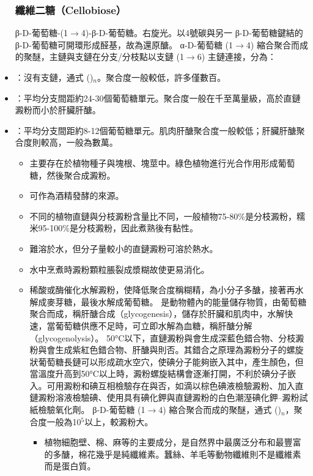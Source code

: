 \documentclass[a4paper,12pt]{report}
\begin{document}
\begin{itemize}
\subsubsection{纖維二糖（Cellobiose）}
β-D-葡萄糖-(1$\to$4)-β-D-葡萄糖。右旋光。以4號碳與另一 β-D-葡萄糖鍵結的β-D-葡萄糖可開環形成醛基，故為還原醣。
α-D-葡萄糖 (1$\to$4) 縮合聚合而成的聚醚，主鏈與支鏈在分支/分枝點以支鏈 (1$\to$6) 主鏈連接，分為：
\bit
\item {}：沒有支鏈，通式 ()$_n$。聚合度一般較低，許多僅數百。
\item {}：平均分支間距約24-30個葡萄糖單元。聚合度一般在千至萬量級，高於直鏈澱粉而小於肝臟肝醣。
\item {}：平均分支間距約8-12個葡萄糖單元。肌肉肝醣聚合度一般較低；肝臟肝醣聚合度則較高，一般為數萬。
\eit
{}
\begin{itemize}
\item 主要存在於植物種子與塊根、塊莖中。綠色植物進行光合作用形成葡萄糖，然後聚合成澱粉。
\item 可作為酒精發酵的來源。
\item 不同的植物直鏈與分枝澱粉含量比不同，一般植物75-80\%是分枝澱粉，糯米95-100\%是分枝澱粉，因此煮熟後有黏性。
\item 難溶於水，但分子量較小的直鏈澱粉可溶於熱水。
\item 水中烹煮時澱粉顆粒脹裂成漿糊故使更易消化。
\item 稀酸或酶催化水解澱粉，使降低聚合度稱糊精，為小分子多醣，接著再水解成麥芽糖，最後水解成葡萄糖。
\eit
{}
是動物體內的能量儲存物質，由葡萄糖聚合而成，稱肝醣合成（glycogenesis），儲存於肝臟和肌肉中，水解快速，當葡萄糖供應不足時，可立即水解為血糖，稱肝醣分解（glycogenolysis）。
50°C以下，直鏈澱粉與會生成深藍色錯合物、分枝澱粉與會生成紫紅色錯合物、肝醣與則否。其錯合之原理為澱粉分子的螺旋狀葡萄糖長鏈可以形成疏水空穴，使碘分子能夠嵌入其中，產生顏色，但當溫度升高到50°C以上時，澱粉螺旋結構會逐漸打開，不利於碘分子嵌入。可用澱粉和碘互相檢驗存在與否，如滴以棕色碘液檢驗澱粉、加入直鏈澱粉溶液檢驗碘、使用具有碘化鉀與直鏈澱粉的白色潮溼碘化鉀–澱粉試紙檢驗氧化劑。
β-D-葡萄糖 (1$\to$4) 縮合聚合而成的聚醚，通式 ()$_n$，聚合度一般為10$^5$以上，較澱粉大。
\begin{itemize}
\item 植物細胞壁、棉、麻等的主要成分，是自然界中最廣泛分布和最豐富的多醣，棉花幾乎是純纖維素。蠶絲、羊毛等動物纖維則不是纖維素而是蛋白質。

\end{itemize}
\end{itemize}
\end{itemize}
\end{document}
